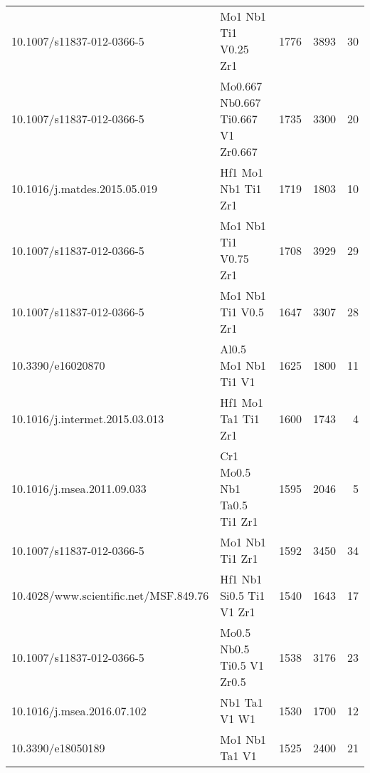 \begin{tabular}{llrrr}
             10.1007/s11837-012-0366-5 &                        Mo1 Nb1 Ti1 V0.25 Zr1 &                1776 &                 3893 &                        30 \\
             10.1007/s11837-012-0366-5 &           Mo0.667 Nb0.667 Ti0.667 V1 Zr0.667 &                1735 &                 3300 &                        20 \\
          10.1016/j.matdes.2015.05.019 &                          Hf1 Mo1 Nb1 Ti1 Zr1 &                1719 &                 1803 &                        10 \\
             10.1007/s11837-012-0366-5 &                        Mo1 Nb1 Ti1 V0.75 Zr1 &                1708 &                 3929 &                        29 \\
             10.1007/s11837-012-0366-5 &                         Mo1 Nb1 Ti1 V0.5 Zr1 &                1647 &                 3307 &                        28 \\
                     10.3390/e16020870 &                         Al0.5 Mo1 Nb1 Ti1 V1 &                1625 &                 1800 &                        11 \\
        10.1016/j.intermet.2015.03.013 &                          Hf1 Mo1 Ta1 Ti1 Zr1 &                1600 &                 1743 &                         4 \\
            10.1016/j.msea.2011.09.033 &                  Cr1 Mo0.5 Nb1 Ta0.5 Ti1 Zr1 &                1595 &                 2046 &                         5 \\
             10.1007/s11837-012-0366-5 &                              Mo1 Nb1 Ti1 Zr1 &                1592 &                 3450 &                        34 \\
 10.4028/www.scientific.net/MSF.849.76 &                     Hf1 Nb1 Si0.5 Ti1 V1 Zr1 &                1540 &                 1643 &                        17 \\
             10.1007/s11837-012-0366-5 &                   Mo0.5 Nb0.5 Ti0.5 V1 Zr0.5 &                1538 &                 3176 &                        23 \\
            10.1016/j.msea.2016.07.102 &                                Nb1 Ta1 V1 W1 &                1530 &                 1700 &                        12 \\
                     10.3390/e18050189 &                               Mo1 Nb1 Ta1 V1 &                1525 &                 2400 &                        21 \\
\bottomrule
\end{tabular}
